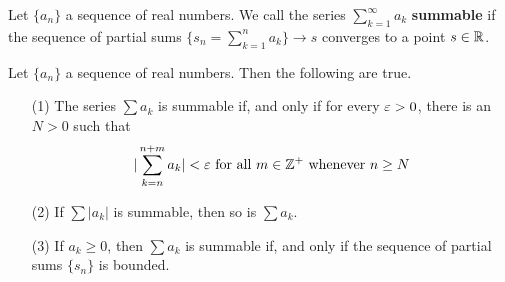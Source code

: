 \begin{definition}
    Let $\{a_n\}$ a sequence of real numbers. We call the series
    $\sum_{k=1}^\infty{a_k}$ \textbf{summable} if the sequence of partial sums
    $\{s_n=\sum_{k=1}^n{a_k}\} \xrightarrow{} s$ converges to a point $s \in
    \mathbb{R}$.
\end{definition}

\begin{lemma}\label{1.2.7}
    Let $\{a_n\}$ a sequence of real numbers. Then the following are true.
    \begin{enumerate}
        \item[(1)] The series $\sum{a_k}$ is summable if, and only if for every
            $\varepsilon>0$, there is an  $N>0$ such that
            \begin{equation*}
                |\sum_{k=n}^{n+m}{a_k}|<\varepsilon \text{ for all } m \in \mathbb{Z}^+
                \text{ whenever } n \geq N
            \end{equation*}

        \item[(2)] If $\sum{|a_k|}$ is summable, then so is $\sum{a_k}$.

        \item[(3)] If $a_k \geq 0$, then  $\sum{a_k}$ is summable if, and only
            if the sequence of partial sums $\{s_n\}$ is bounded.
    \end{enumerate}
\end{lemma}

